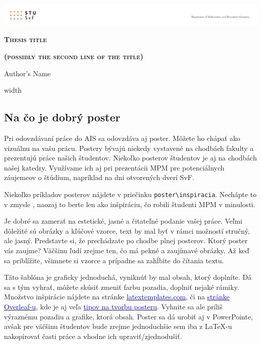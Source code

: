 \documentclass[portrait,a0]{a0poster}
\begin{document}
	\renewcommand{\baselinestretch}{1.5} %
	\fontsize{25pt}{20pt} %
	\selectfont
	
	\centerline{\includegraphics[width=\paperwidth]{header/header.pdf}}
	\centerline{\huge \textsc{\textbf{Thesis title}}}
	\centerline{\huge \textsc{\textbf{(possibly the second line of the title)}}}
	\vskip 1cm 
	\centerline{\Large Author's Name}
	\vskip 0.5cm
	\leaders\vrule width \linewidth\vskip 3pt

	\begin{multicols}{3} %
	
	\section*{Na čo je dobrý poster}
	
	Pri odovzdávaní práce do AIS sa odovzdáva aj poster. Môžete ho chápať ako vizuálnu  na vašu prácu. Postery bývajú niekedy vystavené na chodbách fakulty a prezentujú práce našich študentov. Niekoľko posterov študentov je aj na chodbách našej katedry. Využívame ich aj pri prezentácii MPM pre potenciálnych záujemcov o štúdium, napríklad na dni otvorených dverí SvF.
	
	Niekoľko príkladov posterov nájdete v priečinku \verb*|poster\inspiracia|. Nechápte to v zmysle , naozaj to berte len ako inšpiráciu, čo robili študenti MPM v minulosti.
	
	Je dobré sa zamerať na estetické, jasné a čitateľné podanie vašej práce. Veľmi dôležité sú obrázky a kľúčové vzorce, text by mal byť v rámci možností stručný, ale jasný. Predstavte si, že prechádzate po chodbe plnej posterov. Ktorý poster vás zaujme? Väčšinu ľudí zrejme ten, čo má pekné a zaujímavé obrázky. Až keď sa priblížite, všimnete si vzorce a prípadne sa zahĺbite do čítania textu.
	
	Táto šablóna je graficky jednoduchá, vyniknúť by mal obsah, ktorý doplníte. Dá sa s tým vyhrať, môžete skúsiť zmeniť farbu pozadia, doplniť nejaké rámiky. Množstvo inšpirácie nájdete na stránke \href{https://www.latextemplates.com/cat/conference-posters}{\textcolor{blue}{latextemplates.com}}, či na  \href{https://www.overleaf.com/gallery/tagged/poster}{\textcolor{blue}{stránke Overleaf-u}}, kde je aj veľa \href{https://www.overleaf.com/learn/latex/Posters}{\textcolor{blue}{tipov na tvorbu posteru}}. Vyhnite sa ale príliš výraznému pozadiu a grafike, ktorá  obsah. Poster sa dá urobiť aj v PowerPointe, avšak pre väčšinu študentov bude zrejme jednoduchšie sem iba z LaTeX-u nakopírovať časti práce a vhodne ich upraviť/zjednodušiť.
	

\end{multicols}
\end{document}
